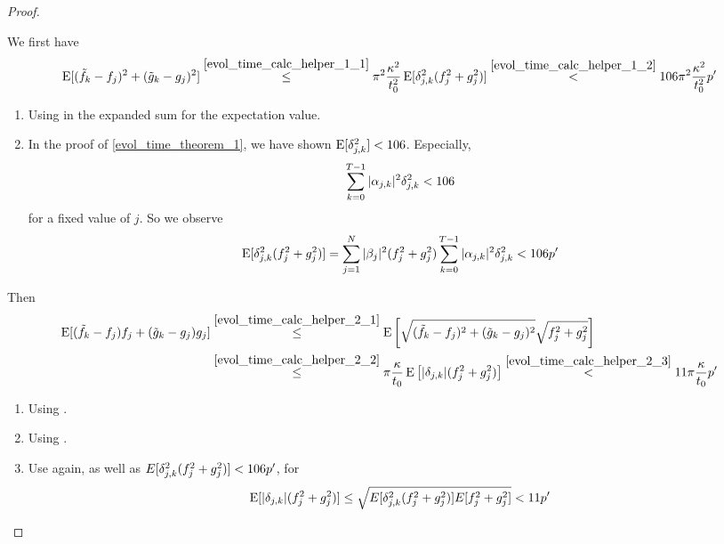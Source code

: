 \begin{proof}
\begin{enumerate}[label=(\roman*), wide]
        We first have
        \begin{align}
            \operatorname{E}[(\tilde{f}_k-f_j)^2+(\tilde{g}_k-g_j)^2] \overset{\ref{evol_time_calc_helper_1_1}}{\leq} \pi^2 \frac{\kappa^2}{t_0^2} \operatorname{E}[\delta_{j, k}^2(f_j^2+g_j^2)] \overset{\ref{evol_time_calc_helper_1_2}}{<} 106 \pi^2 \frac{\kappa^2}{t_0^2} p'
        \end{align}
        \begin{enumerate}[label=(\arabic*)]
            \item \label{evol_time_calc_helper_1_1} Using  in the expanded sum for the expectation value.
            \item \label{evol_time_calc_helper_1_2} In the proof of \ref{evol_time_theorem_1}, we have shown \(\operatorname{E}[\delta_{j, k}^2] < 106\). Especially,
            \begin{align}
                \sum_{k=0}^{T-1} |\alpha_{j, k}|^2\delta_{j, k}^2 < 106
            \end{align}
            for a fixed value of \(j\). So we observe
            \begin{align}
                \operatorname{E}[\delta_{j, k}^2(f_j^2+g_j^2)] = \sum_{j=1}^N |\beta_j|^2 (f_j^2+g_j^2) \sum_{k=0}^{T-1} |\alpha_{j, k}|^2\delta_{j, k}^2 < 106p'
            \end{align}
        \end{enumerate}
        Then
        \begin{align}
            \operatorname{E}[(\tilde{f}_k-f_j)f_j+(\tilde{g}_k-g_j)g_j] &\overset{\ref{evol_time_calc_helper_2_1}}{\leq} \operatorname{E}\left[\sqrt{(\tilde{f}_k-f_j)^2+(\tilde{g}_k-g_j)^2}\sqrt{f_j^2+g_j^2}\right]\\
            &\overset{\ref{evol_time_calc_helper_2_2}}{\leq} \pi\frac{\kappa}{t_0} \operatorname{E}\left[|\delta_{j, k}|(f_j^2+g_j^2)\right] \overset{\ref{evol_time_calc_helper_2_3}}{<} 11 \pi \frac{\kappa}{t_0} p'
        \end{align}
        \begin{enumerate}[label=(\arabic*)]
            \item \label{evol_time_calc_helper_2_1} Using .
            \item \label{evol_time_calc_helper_2_2} Using .
            \item \label{evol_time_calc_helper_2_3} Use  again, as well as \(E[\delta_{j, k}^2(f_j^2+g_j^2)] < 106p'\), for
            \begin{align}
                \operatorname{E}[|\delta_{j, k}|(f_j^2+g_j^2)] \leq \sqrt{E[\delta_{j, k}^2(f_j^2+g_j^2)]E[f_j^2+g_j^2]} < 11p'
            \end{align}
        \end{enumerate}


\end{enumerate}
\end{proof}
